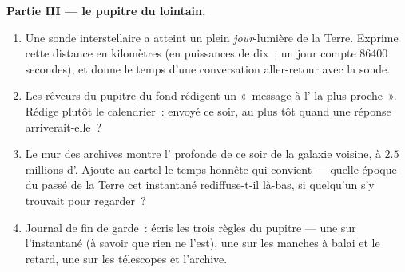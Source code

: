 \begin{problem}
\medskip\noindent\textbf{Partie III --- le pupitre du lointain.}
\begin{enumerate}[resume]
  \item Une sonde interstellaire a atteint un plein
        \emph{jour}-lumière de la Terre. Exprime cette distance en
        kilomètres (en puissances de dix~; un jour compte $86400$
        secondes), et donne le temps d'une conversation
        aller-retour avec la sonde.
  \item Les rêveurs du pupitre du fond rédigent un «~message à
        l' la plus proche~». Rédige plutôt le calendrier~:
        envoyé ce soir, au plus tôt quand une réponse
        arriverait-elle~?
  \item Le mur des archives montre l' profonde de ce soir de la
        galaxie voisine, à $2.5$ millions d'. Ajoute
        au cartel le temps honnête qui convient --- quelle époque du
        passé de la Terre cet instantané rediffuse-t-il là-bas, si
        quelqu'un s'y trouvait pour regarder~?
  \item Journal de fin de garde~: écris les trois règles du
        pupitre --- une sur l'instantané (à savoir que rien ne
        l'est), une sur les manches à balai et le retard, une sur
        les télescopes et l'archive.
\end{enumerate}
\end{problem}

